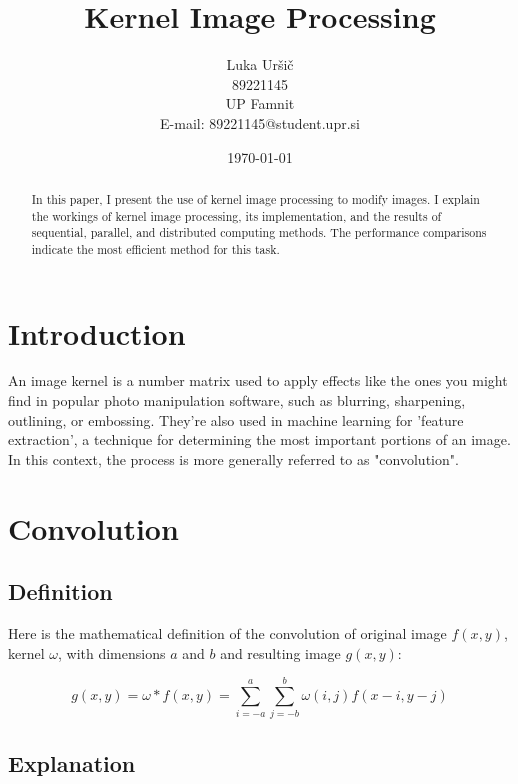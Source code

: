 \documentclass{article}
\title{Kernel Image Processing}
\author{Luka Uršič \\ 89221145 \\ UP Famnit \\ E-mail: 89221145@student.upr.si}
\date{\today}
\begin{document}
\maketitle
\thispagestyle{empty}

\begin{abstract}
    In this paper, I present the use of kernel image processing to modify images. I explain the workings of kernel image processing, its implementation, and the results of sequential, parallel, and distributed computing methods. The performance comparisons indicate the most efficient method for this task.

\end{abstract}

\begin{multicols}{2}

    \section{Introduction}
    An image kernel is a number matrix used to apply effects like the ones you might find in popular photo manipulation software, such as blurring, sharpening, outlining, or embossing. They're also used in machine learning for 'feature extraction', a technique for determining the most important portions of an image. In this context, the process is more generally referred to as "convolution".
    \cite{setosa}

    \section{Convolution}

    \subsection{Definition}

    Here is the mathematical definition of the convolution of original image $f(x, y)$, kernel $\omega$, with dimensions $a$ and $b$ and resulting image $g(x, y)$:

    \begin{equation}
        g(x, y) = \omega * f(x, y) = \sum_{i=-a}^{a} \sum_{j=-b}^{b} \omega(i, j) f(x-i, y-j)
    \end{equation}
    \cite{theodoridis2006pattern}


    \subsection{Explanation}


\end{multicols}
\end{document}
